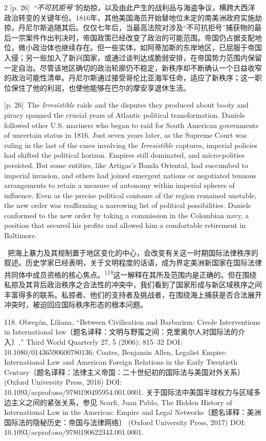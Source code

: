 \documentclass[10pt,a4paper]{article}
\begin{document}
\begin{paracol}{2}
{\scriptsize\color{gray} [p. 26]}\ \textit{“不可抗拒号”}的劫掠，以及由此产生的战利品与海盗争议，横跨大西洋政治转变的关键年份。1816年，其他美国海员开始替地位未定的南美洲政府实施劫掠，丹尼尔斯追随其后。仅仅七年后，当最高法院对涉及“不可抗拒号”捕获物的最后一宗案件作出判决时，帝国政策已经改变了政治的可能范围。帝国仍占据支配地位，微小政治体也继续存在。但一些实体，如阿蒂加斯的东岸地区，已屈服于帝国入侵；另一些加入了新兴国家，或通过谈判达成脆弱安排，在帝国势力范围内保留一定自治。尽管该地区确切的政治轮廓仍不稳定，新秩序却不断确认一个日益收窄的政治可能性清单。丹尼尔斯通过接受哥伦比亚海军任命，适应了新秩序；这一职位保住了他的利润，也使他能够在巴尔的摩安享退休生活。\par
\switchcolumn
{\scriptsize\color{gray} [p. 26]}\ The \textit{Irresistible} raids and the disputes they produced about booty and piracy spanned the crucial years of Atlantic political transformation. Daniels followed other U.S. mariners who began to raid for South American governments of uncertain status in 1816. Just seven years later, as the Supreme Court was ruling in the last of the cases involving the \textit{Irresistible} captures, imperial policies had shifted the political horizon. Empires still dominated, and micro-polities persisted. But some entities, like Artigas’s Banda Oriental, had succumbed to imperial invasion, and others had joined emergent nations or negotiated tenuous arrangements to retain a measure of autonomy within imperial spheres of influence. Even as the precise political contours of the region remained unstable, the new order was reaffirming a narrowing list of political possibilities. Daniels conformed to the new order by taking a commission in the Colombian navy, a position that secured his profits and allowed him a comfortable retirement in Baltimore.\par
\switchcolumn*
{\scriptsize\color{gray} [p. 26]}\ 把海上暴力及其规制置于地区变化的中心，会改变有关这一时期国际法律秩序的叙述。历史学家已经表明，关于文明程度的话语，成为界定美洲新国家在国际法律共同体中成员资格的核心焦\mbox{点。\textsuperscript{118}}这一解释在其所及范围内是正确的。但在围绕私掠及其背后政治秩序之合法性的冲突中，我们看到了国家形成与新区域秩序之间丰富得多的联系。私掠者、他们的支持者及挑战者，在围绕海上捕获是否合法展开冲突时，被迫回应国际秩序形态的根本问题。\par{\small 118. Obregón, Liliana, “Between Civilisation and Barbarism: Creole Interventions in International law〔题名译释：文明与野蛮之间：克里奥尔人对国际法的介入〕,” Third World Quarterly 27, 5 (2006): 815–32 DOI: 10.1080/01436590600780136; Coates, Benjamin Allen, Legalist Empire: International Law and American Foreign Relations in the Early Twentieth Century〔题名译释：法律主义帝国：二十世纪初的国际法与美国对外关系〕 (Oxford University Press, 2016) DOI: 10.1093/acprof:oso/9780190495954.001.0001. 关于国际法中美国半球权力与区域多边主义之间的紧张关系，参见 Scarfi, Juan Pablo, The Hidden History of International Law in the Americas: Empire and Legal Networks〔题名译释：美洲国际法的隐秘历史：帝国与法律网络〕 (Oxford University Press, 2017) DOI: 10.1093/acprof:oso/9780190622343.001.0001.\par}

\end{paracol}
\end{document}
